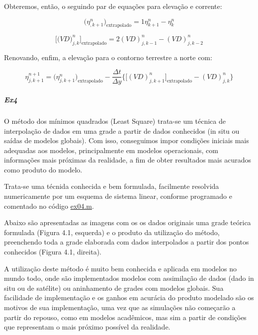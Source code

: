 \documentclass[11pt]{article}
\begin{document}
Obteremos, então, o seguindo par de equações para elevação e corrente:

\begin{equation}
    \bigg( \eta^{n}_{,k+1} \bigg)_{\text{extrapolado}} = 1\eta^{n}_{k+1} - \eta^{n}_k
    \label{ex3B:eq7}
\end{equation}

\begin{equation}
    \bigg[ \bigg( VD \bigg)^{n}_{j,k} \bigg]_{\text{extrapolado}} = 2(VD)^{n}_{j,k-1} - (VD)^{n}_{j,k-2}
    \label{ex3B:eq8}
\end{equation}
\bigskip

Renovando, enfim, a elevação para o contorno terrestre a norte com:

\begin{equation}
    \eta^{n+1}_{j,k+1} = \bigg( \eta^{n}_{j,k+1} \bigg)_{\text{extrapolado}} - \frac{\Delta{t}}{\Delta{y}}\bigg\{ \bigg[ (VD)^{n}_{j,k+1} \bigg]_{\text{extrapolado}} -(VD)^{n}_{j,k} \bigg\}
    \label{ex3B:eq9}
\end{equation}

\dotfill

    \subparagraph{Ex4}\label{ex4}

O método dos mínimos quadrados (Least Square) trata-se um técnica de
interpolação de dados em uma grade a partir de dados conhecidos (in situ
ou saídas de modelos globais). Com isso, conseguimos impor condições
iniciais mais adequadas aos modelos, principalmente em modelos
operacionais, com informações mais próximas da realidade, a fim de obter
resultados mais acurados como produto do modelo.

Trata-se uma técnida conhecida e bem formulada, facilmente resolvida
numericamente por um esquema de sistema linear, conforme programado e
comentado no código \href{../codes/ex04.m}{ex04.m}.

Abaixo são apresentadas as imagens com os os dados originais uma grade
teórica formulada (Figura 4.1, esquerda) e o produto da utilização do
método, preenchendo toda a grade elaborada com dados interpolados a
partir dos pontos conhecidos (Figura 4.1, direita).

A utilização deste método é muito bem conhecida e aplicada em modelos no
mundo todo, onde são implementados modelos com assimilação de dados
(dado in situ ou de satélite) ou aninhamento de grades com modelos
globais. Sua facilidade de implementação e os ganhos em acurácia do
produto modelado são os motivos de sua implementação, uma vez que as
simulações não começarão a partir do repouso, como em modelos
acadêmicos, mas sim a partir de condições que representam o mais próximo
possível da realidade.
\end{document}
